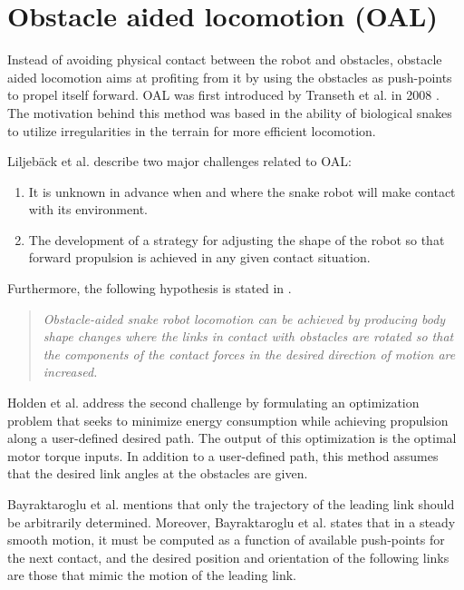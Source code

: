 



\section{Obstacle aided locomotion (OAL)}

Instead of avoiding physical contact between the robot and obstacles, obstacle aided locomotion aims at profiting from it by using the obstacles as push-points to propel itself forward. OAL was first introduced by Transeth et al. in 2008 \cite{transeth2008snake}. The motivation behind this method was based in the ability of biological snakes to utilize irregularities in the terrain for more efficient locomotion.

Liljebäck et al. \cite{liljeback2012snake} describe two major challenges related to OAL:
\begin{enumerate}
  \item It is unknown in advance when and where the snake robot will make contact with its environment.
  \item The development of a strategy for adjusting the shape of the robot so that forward propulsion is achieved in any given contact situation.
\end{enumerate}
Furthermore, the following hypothesis is stated in \cite{liljeback2012snake}.
\begin{quote}
   \textit{ Obstacle-aided snake robot locomotion can be achieved by producing body shape changes where the links in contact with obstacles are rotated so that the components of the contact forces in the desired direction of motion are increased.}
\end{quote}

Holden et al. \cite{holden2014optimal} address the second challenge by formulating an optimization problem that seeks to minimize energy consumption while achieving propulsion along a user-defined desired path. The output of this optimization is the optimal motor torque inputs. In addition to a user-defined path, this method assumes that the desired link angles at the obstacles are given.

Bayraktaroglu et al. \cite{bayraktaroglu2004understanding} mentions that only the trajectory of the leading link should be arbitrarily determined. Moreover, Bayraktaroglu et al. \cite{bayraktaroglu2004understanding} states that in a steady smooth motion, it must be computed as a function of available push-points for the next contact, and the desired position and orientation of the following links are those that mimic the motion of the leading link.


